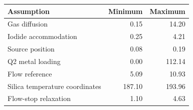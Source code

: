 \begin{tabular}{lrr}
\toprule
Assumption & Minimum & Maximum \\
\midrule
Gas diffusion & 0.15 & 14.20 \\
Iodide accommodation & 0.25 & 4.21 \\
Source position & 0.08 & 0.19 \\
Q2 metal loading & 0.00 & 112.14 \\
Flow reference & 5.09 & 10.93 \\
Silica temperature coordinates & 187.10 & 193.96 \\
Flow-stop relaxation & 1.10 & 4.63 \\
\bottomrule
\end{tabular}
